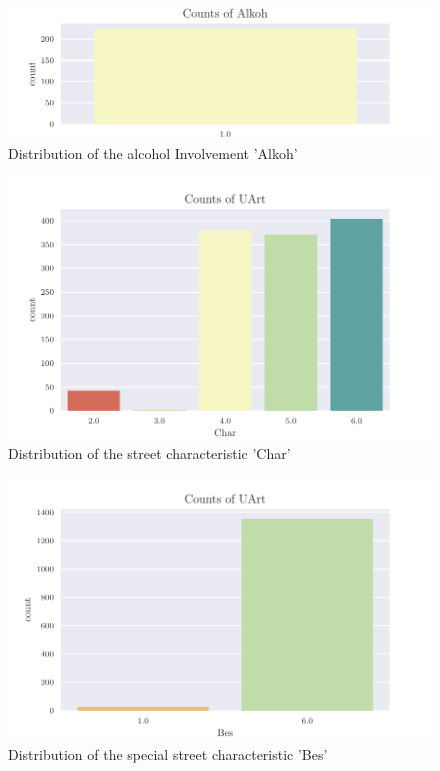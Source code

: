 \documentclass[a4paper,headsepline,footsepline,fontsize=11pt,BCOR=12mm,DIV=12]{report}
\begin{document}
\begin{appendices}
\begin{figure}[h]
	\centering
	\includegraphics[scale=1]{../CorrAnalysis/data/BAYSIS/01_dataset/plots/baysis_dataset_count_Alkoh}
	\caption{Distribution of the alcohol Involvement 'Alkoh'}
	\label{img:appendix_baysis_dataset_Alkoh}
\end{figure}

\begin{figure}[h]
	\centering
	\includegraphics[scale=1]{../CorrAnalysis/data/BAYSIS/01_dataset/plots/baysis_dataset_count_Char}
	\caption{Distribution of the street characteristic 'Char'}
	\label{img:appendix_baysis_dataset_Char}
\end{figure}

\begin{figure}[h]
	\centering
	\includegraphics[scale=1]{../CorrAnalysis/data/BAYSIS/01_dataset/plots/baysis_dataset_count_Bes}
	\caption{Distribution of the special street characteristic 'Bes'}
	\label{img:appendix_baysis_dataset_Bes}
\end{figure}


\end{appendices}
\end{document}
